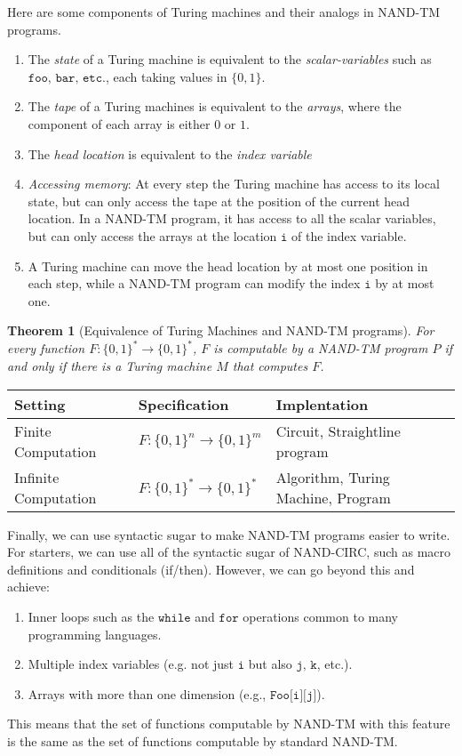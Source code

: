 \documentclass[a4paper, 12pt]{report}
\newtheorem{theorem}{Theorem}[section]
\theoremstyle{remark}
\theoremstyle{definition}
\begin{document}
Here are some components of Turing machines and their analogs in NAND-TM programs. 
\begin{enumerate}
    \item The \textit{state} of a Turing machine is equivalent to the \textit{scalar-variables} such as $\texttt{foo, bar, etc.}$, each taking values in $\{0,1\}$. 
    \item The \textit{tape} of a Turing machines is equivalent to the \textit{arrays}, where the component of each array is either $0$ or $1$. 
    \item The \textit{head location} is equivalent to the \textit{index variable}
    \item \textit{Accessing memory}: At every step the Turing machine has access to its local state, but can only access the tape at the position of the current head location. In a NAND-TM program, it has access to all the scalar variables, but can only access the arrays at the location $\texttt{i}$ of the index variable. 
    \item A Turing machine can move the head location by at most one position in each step, while a NAND-TM program can modify the index $\texttt{i}$ by at most one. 
\end{enumerate}

\begin{theorem}[Equivalence of Turing Machines and NAND-TM programs]
For every function $F: \{0,1\}^* \longrightarrow \{0,1\}^*$, $F$ is computable by a NAND-TM program $P$ if and only if there is a Turing machine $M$ that computes $F$. 
\end{theorem}

\begin{center}
\begin{tabular}{l|l|l}
    Setting & Specification & Implentation \\
    \hline
    Finite Computation& $F: \{0,1\}^n \rightarrow \{0,1\}^m$ & Circuit, Straightline program \\
    Infinite Computation & $F: \{0,1\}^* \rightarrow \{0,1\}^*$ & Algorithm, Turing Machine, Program
\end{tabular}
\end{center}

Finally, we can use syntactic sugar to make NAND-TM programs easier to write. For starters, we can use all of the syntactic sugar of NAND-CIRC, such as macro definitions and conditionals (if/then). However, we can go beyond this and achieve: 
\begin{enumerate}
    \item Inner loops such as the $\texttt{while}$ and $\texttt{for}$ operations common to many programming languages. 
    \item Multiple index variables (e.g. not just $\texttt{i}$ but also $\texttt{j, k}$, etc.). 
    \item Arrays with more than one dimension (e.g., $\texttt{Foo[i][j]}$). 
\end{enumerate}
This means that the set of functions computable by NAND-TM with this feature is the same as the set of functions computable by standard NAND-TM.
\end{document}
